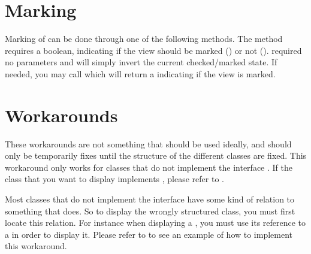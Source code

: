 \section{Marking}
\label{sec:marking}
Marking of  can be done through one of the following methods. The method  requires a boolean, indicating if the view should be marked () or not ().  required no parameters and will simply invert the current checked/marked state. If needed, you may call  which will return a  indicating if the view is marked. 


\section{Workarounds}
\label{sec:workarounds}

\begin{note}
    These workarounds are not something that should be used ideally, and should only be temporarily fixes until the structure of the different classes are fixed. This workaround only works for classes that do not implement the interface . If the class that you want to display implements , please refer to .    
\end{note}

\noindent
Most classes that do not implement the interface  have some kind of relation to something that does. So to display the wrongly structured class, you must first locate this relation. For instance when displaying a , you must use its reference to a  in order to display it. Please refer to  to see an example of how to implement this workaround.

 